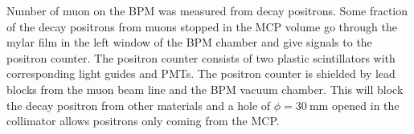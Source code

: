 \documentclass[preprint,3p,twocolumn]{elsarticle}
\begin{document}
Number of muon on the BPM was measured from decay positrons.
Some fraction of the decay positrons from muons stopped in the MCP volume go through the mylar film in the left window of the BPM chamber and give signals to the positron counter. 
The positron counter consists of two plastic scintillators with corresponding light guides and PMTs. %
The positron counter is shielded by lead blocks from the muon beam line and the BPM vacuum chamber. This will block the decay positron from other materials and a hole of $\phi=\SI{30}{\mm}$  opened in the collimator allows positrons only coming from the MCP.
\end{document}
